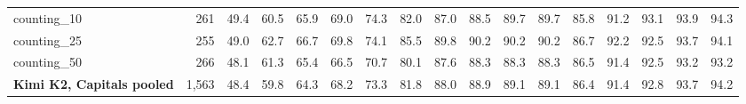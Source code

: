\begin{table}[h]
\begin{tabular}{l r r r r r r r r r r r r r r r r}
counting\_10 & 261 & 49.4 & 60.5 & 65.9 & 69.0 & 74.3 & 82.0 & 87.0 & 88.5 & 89.7 & 89.7 & 85.8 & 91.2 & 93.1 & 93.9 & 94.3 \\
counting\_25 & 255 & 49.0 & 62.7 & 66.7 & 69.8 & 74.1 & 85.5 & 89.8 & 90.2 & 90.2 & 90.2 & 86.7 & 92.2 & 92.5 & 93.7 & 94.1 \\
counting\_50 & 266 & 48.1 & 61.3 & 65.4 & 66.5 & 70.7 & 80.1 & 87.6 & 88.3 & 88.3 & 88.3 & 86.5 & 91.4 & 92.5 & 93.2 & 93.2 \\
\addlinespace[2pt]
\textbf{Kimi K2, Capitals pooled} & 1,563 & 48.4 & 59.8 & 64.3 & 68.2 & 73.3 & 81.8 & 88.0 & 88.9 & 89.1 & 89.1 & 86.4 & 91.4 & 92.8 & 93.7 & 94.2 \\
\bottomrule
\end{tabular}
\end{table}
